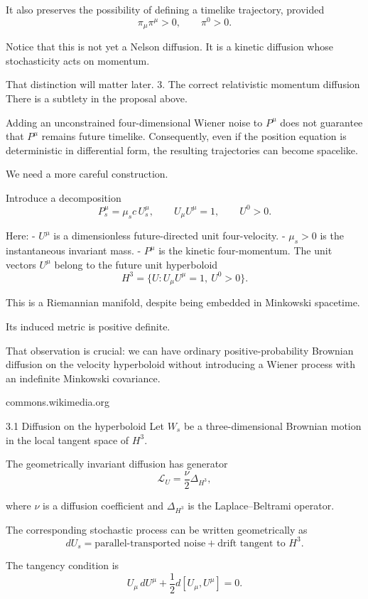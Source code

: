 It also preserves the possibility of defining a timelike trajectory, provided
\[
\pi_\mu\pi^\mu>0,\qquad \pi^0>0.
\]

Notice that this is not yet a Nelson diffusion. It is a kinetic diffusion whose stochasticity acts on momentum.

That distinction will matter later.
3. The correct relativistic momentum diffusion
There is a subtlety in the proposal above.

Adding an unconstrained four-dimensional Wiener noise to \(P^\mu\) does not guarantee that \(P^\mu\) remains future timelike. Consequently, even if the position equation is deterministic in differential form, the resulting trajectories can become spacelike.

We need a more careful construction.

Introduce a decomposition
\[
\boxed{
P^\mu_s=\mu_s c\,U^\mu_s,
\qquad
U_\mu U^\mu=1,
\qquad U^0>0.
}
\tag{6}
\]

Here:
- \(U^\mu\) is a dimensionless future-directed unit four-velocity.
- \(\mu_s>0\) is the instantaneous invariant mass.
- \(P^\mu\) is the kinetic four-momentum.
The unit vectors \(U^\mu\) belong to the future unit hyperboloid
\[
H^3=\{U:U_\mu U^\mu=1,\ U^0>0\}.
\]

This is a Riemannian manifold, despite being embedded in Minkowski spacetime.

Its induced metric is positive definite.

That observation is crucial: we can have ordinary positive-probability Brownian diffusion on the velocity hyperboloid without introducing a Wiener process with an indefinite Minkowski covariance.







commons.wikimedia.org


3.1 Diffusion on the hyperboloid
Let \(W_s\) be a three-dimensional Brownian motion in the local tangent space of \(H^3\).

The geometrically invariant diffusion has generator
\[
\mathcal L_U
=
\frac{\nu}{2}\Delta_{H^3},
\tag{7}
\]

where \(\nu\) is a diffusion coefficient and \(\Delta_{H^3}\) is the Laplace–Beltrami operator.

The corresponding stochastic process can be written geometrically as
\[
dU_s=\text{parallel-transported noise}
+\text{drift tangent to }H^3.
\]

The tangency condition is
\[
U_\mu\,dU^\mu
+
\frac12 d[U_\mu,U^\mu]=0.
\tag{8}
\]

